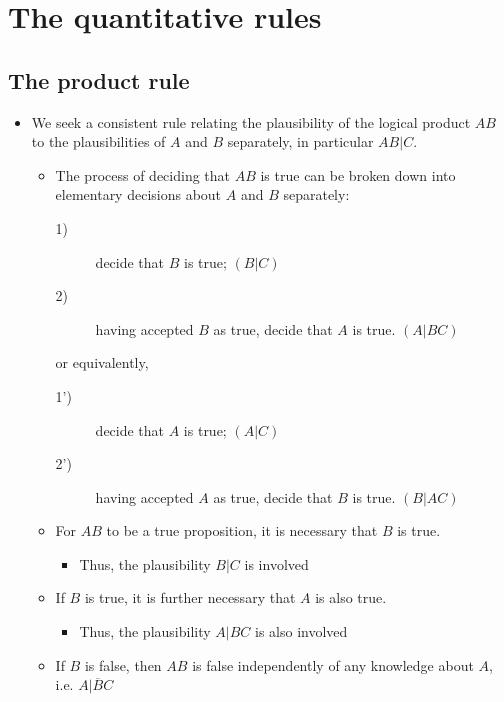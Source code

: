 \documentclass[9pt, letterpaper]{article}
\begin{document}
\section{The quantitative rules}

\subsection{The product rule}

\begin{itemize}
    \item{We seek a consistent rule relating the plausibility of the logical product $AB$ to the plausibilities of $A$ and $B$ separately, in particular $AB|C$.}
        \begin{itemize}
            \item{The process of deciding that $AB$ is true can be broken down into elementary decisions about $A$ and $B$ separately:}
                \begin{description}
                    \item[1)] decide that $B$ is true; $\left(B|C\right)$
                    \item[2)] having accepted $B$ as true, decide that $A$ is true. $\left(A|BC\right)$
                \end{description}
                or equivalently,
                \begin{description}
                    \item[1')] decide that $A$ is true; $\left(A|C\right)$
                    \item[2')] having accepted $A$ as true, decide that $B$ is true. $\left(B|AC\right)$
                \end{description}
            \item{For $AB$ to be a true proposition, it is necessary that $B$ is true.}
                \begin{itemize}
                    \item{Thus, the plausibility $B|C$ is involved}
                \end{itemize}
            \item{If $B$ is true, it is further necessary that $A$ is also true.}
                \begin{itemize}
                    \item{Thus, the plausibility $A|BC$ is also involved}
                \end{itemize}
            \item{If $B$ is false, then $AB$ is false independently of any knowledge about $A$, i.e. $A|\overline{B}C$}

\end{itemize}
\end{itemize}
\end{document}
